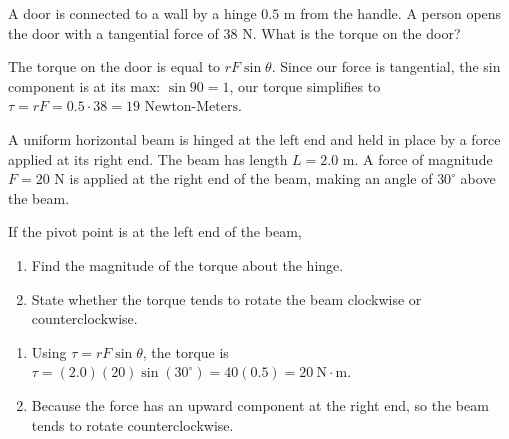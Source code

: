 \begin{Exercise}[title=Door Torque, label=torque1]
A door is connected to a wall by a hinge $0.5 \text{ m}$ from the handle. A person opens the door with a tangential force of $38 \text{ N}$. What is the torque on the door?
\end{Exercise}
\begin{Answer}[ref=torque1]
The torque on the door is equal to $rF\sin\theta$. Since our force is tangential, the sin component is at its max: $\sin 90 = 1$, our torque simplifies to $\tau = rF = 0.5 \cdot 38 = 19 \text{ Newton-Meters}$. 
\end{Answer}
\begin{Exercise}[title=Torque but with a twist!,label=torque2]
A uniform horizontal beam is hinged at the left end and held in place by a force applied at its right end. The beam has length $L=2.0 \text{ m}$. A force of magnitude $F = 20 \text{ N}$ is applied at the right end of the beam, making an angle of $30^\circ$ above the beam.

If the pivot point is at the left end of the beam,
\begin{enumerate}
  \item Find the magnitude of the torque about the hinge.
  \item State whether the torque tends to rotate the beam clockwise or counterclockwise.
\end{enumerate}
\end{Exercise}
\begin{Answer}[ref=torque2]
\begin{enumerate}
  \item Using $\tau = r F \sin\theta$, the torque is $\tau = (2.0)(20)\sin(30^\circ) = 40(0.5) = 20\ \text{N}\cdot\text{m}$.
  \item Because the force has an upward component at the right end, so the beam tends to rotate counterclockwise.
\end{enumerate}
\end{Answer}

